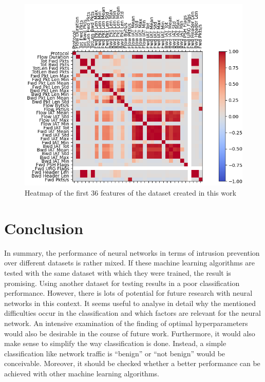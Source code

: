 \documentclass[conference]{IEEEtran}
\begin{document}
\begin{figure}[htbp]  
\centerline{\includegraphics[scale=0.8]{Heatmap-NeueDaten-0-35.png}}
\caption{Heatmap of the first 36 features of the dataset created in this work}
\label{fig:hm2}
\end{figure}

\newpage

\section{Conclusion}\label{conclusion}
In summary, the performance of neural networks in terms of intrusion prevention over different datasets is rather mixed. If these machine learning algorithms are tested with the same dataset with which they were trained, the result is promising. Using another dataset for testing results in a poor classification performance. However, there is lots of potential for future research with neural networks in this context. It seems useful to analyse in detail why the mentioned difficulties occur in the classification and which factors are relevant for the neural network. An intensive examination of the finding of optimal hyperparameters would also be desirable in the course of future work. Furthermore, it would also make sense to simplify the way classification is done. Instead, a simple classification like network traffic is “benign” or “not benign” would be conceivable. Moreover, it should be checked whether a better performance can be achieved with other machine learning algorithms.
\end{document}
